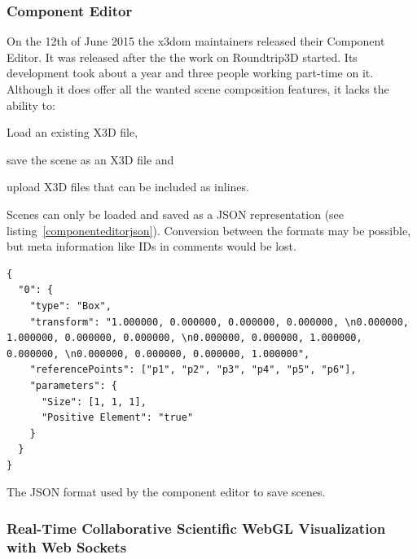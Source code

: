 \clearpage

\subsubsection{Component Editor}
\label{component-editor30}

On the 12th of June 2015 the x3dom maintainers released their Component Editor. \cite{componenteditor}
It was released after the the work on \gls{Roundtrip3D} started.
Its development took about a year and three people working part-time on it. \cite{componenteditoreffort}
Although it does offer all the wanted scene composition features, it lacks the ability to:

\begin{itemize*}
  \item Load an existing \gls{X3D} file,
  \item save the scene as an \gls{X3D} file and
  \item upload \gls{X3D} files that can be included as inlines.
\end{itemize*}

Scenes can only be loaded and saved as a \gls{JSON} representation (see listing~\ref{componenteditorjson}).
Conversion between the formats may be possible, but meta information like \gls{ID}s in comments would be lost.

\begin{listing}
  \begin{verbatim}
{
  "0": {
    "type": "Box",
    "transform": "1.000000, 0.000000, 0.000000, 0.000000, \n0.000000, 1.000000, 0.000000, 0.000000, \n0.000000, 0.000000, 1.000000, 0.000000, \n0.000000, 0.000000, 0.000000, 1.000000",
    "referencePoints": ["p1", "p2", "p3", "p4", "p5", "p6"],
    "parameters": {
      "Size": [1, 1, 1],
      "Positive Element": "true"
    }
  }
}
  \end{verbatim}
  \caption{The \gls{JSON} format used by the component editor to save scenes.}
  \label{componenteditorjson}
\end{listing}

\subsubsection{Real-Time Collaborative Scientific WebGL Visualization with Web Sockets}
\label{rtcswvwws}

